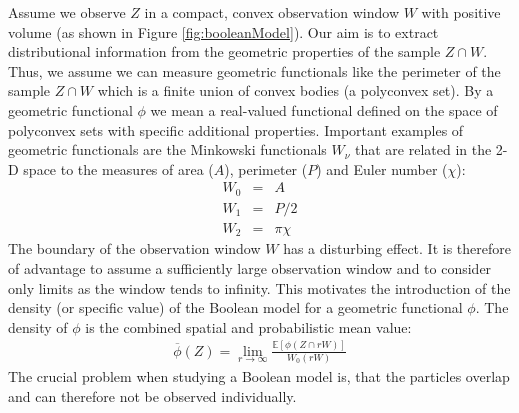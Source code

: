Assume we observe $Z$ in a compact, convex observation window $W$ with positive volume (as shown in Figure \ref{fig:booleanModel}).
Our aim is to extract distributional information from the geometric properties of the sample $Z \cap W$. Thus, we assume we can measure geometric functionals like the perimeter of the sample $Z \cap W$ which is a finite union of convex bodies (a polyconvex set). By a geometric functional $\phi$ we mean a real-valued functional defined on the space of polyconvex sets with specific additional properties. Important examples of geometric functionals are the Minkowski functionals $W_{\nu}$ that are related in the 2-D space to the measures of area ($A$), perimeter ($P$) and Euler number ($\chi$):
\begin{eqnarray}
W_0&=&A\\
W_1&=&P/2\\
W_2&=&\pi \chi
\end{eqnarray}
%
The boundary of the observation window $W$ has a disturbing effect. It is therefore of advantage to assume a sufficiently large observation
window and to consider only limits as the window tends to infinity. This motivates the introduction of the density (or specific value) of the Boolean model for a geometric functional $\phi$. The density of $\phi$ is the combined spatial and probabilistic mean value:\vspace*{-8pt}
\begin{eqnarray}
\overline{\phi}(Z)=\lim_{r\rightarrow\infty}\frac{\mathbb{E}[\phi(Z\cap rW)]}{W_0(rW)}
\end{eqnarray}
The crucial problem when studying a Boolean model is, that the particles overlap and can therefore not be observed individually.

